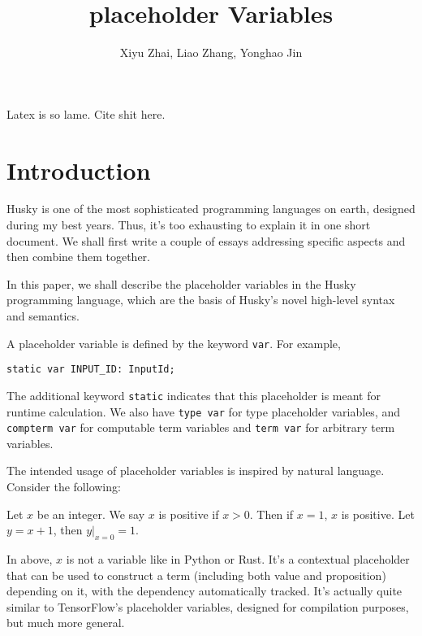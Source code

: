 \documentclass{article}
\title{placeholder Variables}
\author{Xiyu Zhai, Liao Zhang, Yonghao Jin}
\date{}
\newcommand{\huskyinline}[1]{\lstinline[language=Husky]|#1|}
\begin{document}
\maketitle

Latex is so lame. Cite shit \cite{someAuthor2023}here.

\section{Introduction}

Husky is one of the most sophisticated programming languages on earth, designed during my best years. Thus, it's too exhausting to explain it in one short document. We shall first write a couple of essays addressing specific aspects and then combine them together.

In this paper, we shall describe the placeholder variables in the Husky programming language, which are the basis of Husky's novel high-level syntax and semantics.

A placeholder variable is defined by the keyword \huskyinline{var}. For example,
\begin{tcolorbox}[colback=gray!5,colframe=gray!50!black,title=Husky Code]
    \begin{lstlisting}[language=Husky]
static var INPUT_ID: InputId;
    \end{lstlisting}
\end{tcolorbox}

The additional keyword \huskyinline{static} indicates that this placeholder is meant for runtime calculation.
We also have \huskyinline{type var} for type placeholder variables, and \huskyinline{compterm var} for computable term variables and \huskyinline{term var} for arbitrary term variables.

The intended usage of placeholder variables is inspired by natural language. Consider the following:

\begin{tcolorbox}[colback=gray!5,colframe=gray!50!black,title=Example]
    Let $x$ be an integer. We say $x$ is positive if $x>0$. Then if $x=1$, $x$ is positive. Let $y=x+1$, then $y|_{x=0}=1$.
\end{tcolorbox}

In above, $x$ is not a variable like in Python or Rust. It's a contextual placeholder that can be used to construct a term (including both value and proposition) depending on it, with the dependency automatically tracked. It's actually quite similar to TensorFlow's placeholder variables, designed for compilation purposes, but much more general.
\end{document}
